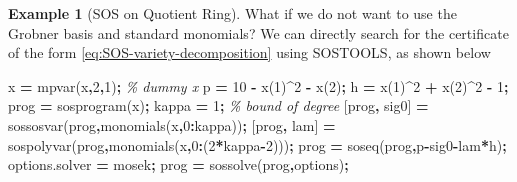\documentclass[
]{book}
\newenvironment{Shaded}{\begin{snugshade}}{\end{snugshade}}
\newcommand{\CommentTok}[1]{\textcolor[rgb]{0.56,0.35,0.01}{\textit{#1}}}
\newcommand{\FloatTok}[1]{\textcolor[rgb]{0.00,0.00,0.81}{#1}}
\newcommand{\NormalTok}[1]{#1}
\newcommand{\OperatorTok}[1]{\textcolor[rgb]{0.81,0.36,0.00}{\textbf{#1}}}
\newcommand{\SpecialStringTok}[1]{\textcolor[rgb]{0.31,0.60,0.02}{#1}}
\newcommand{\VariableTok}[1]{\textcolor[rgb]{0.00,0.00,0.00}{#1}}
\theoremstyle{definition}
\theoremstyle{definition}
\newtheorem{example}{Example}[chapter]
\theoremstyle{definition}
\theoremstyle{definition}
\theoremstyle{remark}
\begin{document}
\begin{example}[SOS on Quotient Ring]
What if we do not want to use the Grobner basis and standard monomials? We can directly search for the certificate of the form \eqref{eq:SOS-variety-decomposition} using SOSTOOLS, as shown below

\begin{Shaded}
\begin{Highlighting}[]
\VariableTok{x} \OperatorTok{=} \VariableTok{mpvar}\NormalTok{(}\SpecialStringTok{\textquotesingle{}x\textquotesingle{}}\OperatorTok{,}\FloatTok{2}\OperatorTok{,}\FloatTok{1}\NormalTok{)}\OperatorTok{;} \CommentTok{\% dummy x }
\VariableTok{p} \OperatorTok{=} \FloatTok{10} \OperatorTok{{-}} \VariableTok{x}\NormalTok{(}\FloatTok{1}\NormalTok{)}\OperatorTok{\^{}}\FloatTok{2} \OperatorTok{{-}} \VariableTok{x}\NormalTok{(}\FloatTok{2}\NormalTok{)}\OperatorTok{;}
\VariableTok{h} \OperatorTok{=} \VariableTok{x}\NormalTok{(}\FloatTok{1}\NormalTok{)}\OperatorTok{\^{}}\FloatTok{2} \OperatorTok{+} \VariableTok{x}\NormalTok{(}\FloatTok{2}\NormalTok{)}\OperatorTok{\^{}}\FloatTok{2} \OperatorTok{{-}} \FloatTok{1}\OperatorTok{;}
\VariableTok{prog} \OperatorTok{=} \VariableTok{sosprogram}\NormalTok{(}\VariableTok{x}\NormalTok{)}\OperatorTok{;}
\VariableTok{kappa} \OperatorTok{=} \FloatTok{1}\OperatorTok{;} \CommentTok{\% bound of degree}
\NormalTok{[}\VariableTok{prog}\OperatorTok{,} \VariableTok{sig0}\NormalTok{] }\OperatorTok{=} \VariableTok{sossosvar}\NormalTok{(}\VariableTok{prog}\OperatorTok{,}\VariableTok{monomials}\NormalTok{(}\VariableTok{x}\OperatorTok{,}\FloatTok{0}\OperatorTok{:}\VariableTok{kappa}\NormalTok{))}\OperatorTok{;}
\NormalTok{[}\VariableTok{prog}\OperatorTok{,} \VariableTok{lam}\NormalTok{] }\OperatorTok{=} \VariableTok{sospolyvar}\NormalTok{(}\VariableTok{prog}\OperatorTok{,}\VariableTok{monomials}\NormalTok{(}\VariableTok{x}\OperatorTok{,}\FloatTok{0}\OperatorTok{:}\NormalTok{(}\FloatTok{2}\OperatorTok{*}\VariableTok{kappa}\OperatorTok{{-}}\FloatTok{2}\NormalTok{)))}\OperatorTok{;}
\VariableTok{prog} \OperatorTok{=} \VariableTok{soseq}\NormalTok{(}\VariableTok{prog}\OperatorTok{,}\VariableTok{p}\OperatorTok{{-}}\VariableTok{sig0}\OperatorTok{{-}}\VariableTok{lam}\OperatorTok{*}\VariableTok{h}\NormalTok{)}\OperatorTok{;}
\VariableTok{options}\NormalTok{.}\VariableTok{solver} \OperatorTok{=} \SpecialStringTok{\textquotesingle{}mosek\textquotesingle{}}\OperatorTok{;}
\VariableTok{prog} \OperatorTok{=} \VariableTok{sossolve}\NormalTok{(}\VariableTok{prog}\OperatorTok{,}\VariableTok{options}\NormalTok{)}\OperatorTok{;}
\end{Highlighting}
\end{Shaded}


\end{example}
\end{document}
